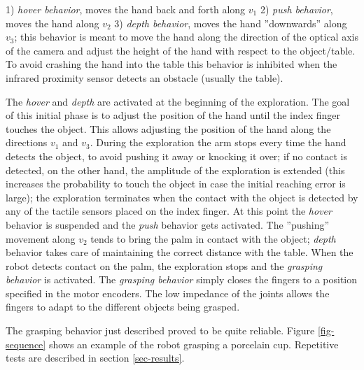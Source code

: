 1) \emph{hover behavior}, moves the hand back and forth along $v_1$
2) \emph{push behavior}, moves the hand along $v_2$
3) \emph{depth behavior},  moves the hand ''downwards'' along $v_3$; this behavior is meant to 
move the hand along the direction of the optical axis of the camera and 
adjust the height of the hand with respect to the object/table. To avoid crashing the hand into the table this behavior is inhibited when the infrared proximity sensor detects an obstacle (usually the table).

The \emph{hover} and \emph{depth} are activated at the beginning of the exploration. The goal of this initial phase is to adjust the position of the 
hand until the index finger touches the object. This allows adjusting 
the position of the hand along the directions $v_1$ and $v_3$. During the 
exploration the arm stops every time the hand detects the object, to avoid 
pushing it away or knocking it over; if no contact is detected, on the 
other hand, the amplitude of the exploration is extended (this 
increases the probability to touch the object in case the initial 
reaching error is large); the exploration terminates when the contact with 
the object is detected by any of the tactile sensors placed on the index 
finger.
At this point the \emph{hover} behavior is suspended and the \emph{push} 
behavior gets activated. The ''pushing'' movement along $v_2$ 
tends to bring the palm in contact with the object; \emph{depth} 
behavior takes care of maintaining the correct 
distance with the table. When the robot detects contact on the palm, 
the exploration stops and the \emph{grasping behavior} is 
activated. The \emph{grasping behavior} simply closes the fingers to a 
position specified in the motor encoders. The low impedance of the 
joints allows the fingers to adapt to the different objects being grasped.

The grasping behavior just described proved to be 
quite reliable. Figure \ref{fig-sequence} shows an example of the robot 
grasping a porcelain cup. Repetitive tests are described in section 
\ref{sec-results}.


